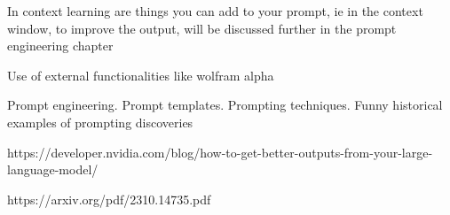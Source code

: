  In context learning are things you can add to your prompt, ie in the context window, to improve the output, will be discussed further in the prompt engineering chapter
 
 Use of external functionalities like wolfram alpha

 Prompt engineering. Prompt templates. Prompting techniques. Funny historical examples of prompting discoveries

https://developer.nvidia.com/blog/how-to-get-better-outputs-from-your-large-language-model/

https://arxiv.org/pdf/2310.14735.pdf

